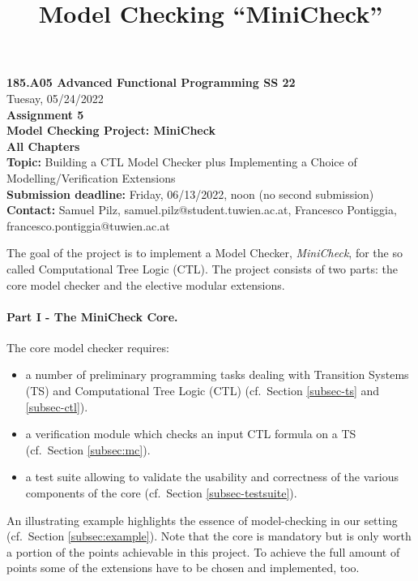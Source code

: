 \documentclass{article}
\title{Model Checking ``MiniCheck''}
\begin{document}
\large
\thispagestyle{empty}
\begin{center}
  {\Large \textbf{185.A05 Advanced Functional Programming SS 22}}  \\ [1ex] 
            Tuesay, 05/24/2022 \\
               {\Large \textbf{Assignment 5}} \\[.5ex]
              {\Large \textbf{Model Checking Project: MiniCheck}} \\[.5ex]
                 \textbf{All Chapters}  \\ [.75ex]
           \textbf{Topic:} Building a CTL Model Checker plus Implementing a Choice of Modelling/Verification Extensions  \\[1ex]
          \textbf{Submission deadline:} Friday, 06/13/2022, noon (no second submission)  \\ [0.5ex]
          \textbf{Contact:} Samuel Pilz, samuel.pilz@student.tuwien.ac.at, 
                            Francesco Pontiggia, francesco.pontiggia@tuwien.ac.at 
\end{center}

\vspace{1ex}
\noindent
\noindent

\newcommand{\code}[1]{\texttt{#1}}

\noindent
The goal of the project is to implement a  Model Checker, \textit{MiniCheck}, 
for the so called Computational Tree Logic (CTL). 
The project consists of two parts: the core model checker and 
the elective modular extensions. 

\paragraph{Part I - The MiniCheck Core.} The core model checker requires: 
\begin{itemize}
    \item a number of preliminary programming tasks dealing with Transition Systems (TS)
          and Computational Tree Logic (CTL) (cf.~Section \ref{subsec-ts} and \ref{subsec-ctl}).
    \item a verification module which checks an input CTL formula on a TS (cf.~Section \ref{subsec:mc}).
    \item a test suite allowing to validate the usability and correctness of the
          various components of the core (cf.~Section \ref{subsec-testsuite}).
\end{itemize}  
An illustrating example highlights the essence of model-checking in our setting (cf.~Section \ref{subsec:example}). Note that the core is mandatory but is only worth a portion of the points achievable in this project. To achieve the full amount of points some of the extensions have to be chosen and implemented, too.
\end{document}
